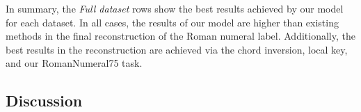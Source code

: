 In summary, the \emph{Full dataset} rows show the best results achieved by our model for each dataset. In all cases, the results of our model are higher than existing methods in the final reconstruction of the Roman numeral label. Additionally, the best results in the reconstruction are achieved via the chord inversion, local key, and our RomanNumeral75 task.

\subsection{Discussion}
